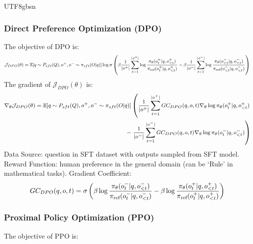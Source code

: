 \documentclass[11pt, a4paper, logo, copyright, nonumbering]{deepseek}
\begin{document}
\begin{CJK*}{UTF8}{gbsn}
\subsubsection{Direct Preference Optimization (DPO)}
The objective of DPO is:
\begin{equation}
\footnotesize
\begin{split}
    \mathcal{J}_{DPO}(\theta) = \mathbb{E}{[q \sim P_{sft}(Q), o^+, o^- \sim \pi_{sft}(O|q)]} \log \sigma \left(  \beta \frac{1}{|o^+|}\sum_{t=1}^{|o^+|} \log \frac{\pi_{\theta}(o^+_t | q, o^+_{<t})}{\pi_{\text{ref}}(o^+_t | q, o^+_{<t})} - \beta \frac{1}{|o^-|}\sum_{t=1}^{|o^-|} \log \frac{\pi_{\theta}(o^-_{<t} | q, o^-_{<t})}{\pi_{\text{ref}}(o^-_{<t} | q,o^-_{<t})} \right) 
\end{split}
\end{equation}
The gradient of $\mathcal{J}_{DPO}(\theta)$ is:
\begin{equation}
\footnotesize
\begin{split}
    \nabla_{\theta}\mathcal{J}_{DPO}(\theta)  = \mathbb{E}{[q \sim P_{sft}(Q), o^+, o^- \sim \pi_{sft}(O|q)]}
     & \left( \frac{1}{|o^+|}\sum_{t=1}^{|o^+|} GC_{DPO}  (q,o,t) \nabla_{\theta}\log\pi_{\theta}(o^+_t | q, o^+_{<t}) \right. \\
    - & \left. \frac{1}{|o^-|}\sum_{t=1}^{|o^-|}  GC_{DPO}  (q,o,t) \nabla_{\theta}\log\pi_{\theta}(o^-_t | q, o^-_{<t}) \right)
\end{split}
\end{equation}
Data Source:  question in SFT dataset with outputs sampled from SFT model.
Reward Function: human preference in the general domain (can be `Rule' in mathematical tasks).
Gradient Coefficient: 
\begin{equation}
\footnotesize
GC_{DPO}(q,o,t) = \sigma\left(\beta\log \frac{\pi_{\theta}(o^-_t | q, o^-_{<t})}{\pi_{\text{ref}}(o^-_t | q, o^-_{<t})} - \beta\log \frac{\pi_{\theta}(o^+_t | q, o^+_{<t})}{\pi_{\text{ref}}(o^+_t | q, o^+_{<t})}\right) 
\label{eq:GC-DPO}
\end{equation}

\subsubsection{Proximal Policy Optimization (PPO)}
The objective of PPO is:


\end{CJK*}
\end{document}
